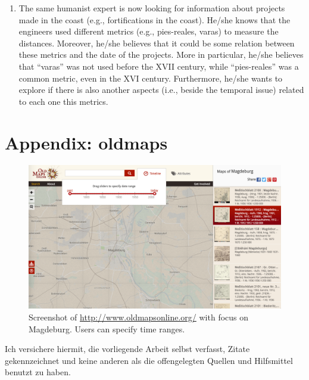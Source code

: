 \documentclass[11pt]{report}
\begin{document}
\begin{enumerate}
	\item The same humanist expert is now looking for information about projects made in the coast (e.g., fortifications in the coast). He/she knows that the engineers used different metrics (e.g., pies-reales, varas) to measure the distances. Moreover, he/she believes that it could be some relation between these metrics and the date of the projects. More in particular, he/she believes that ``varas'' was not used before the XVII century, while ``pies-reales'' was a common metric, even in the XVI century.
Furthermore, he/she wants to explore if there is also another aspects (i.e., beside the temporal issue) related to each one this metrics.
\end{enumerate}

\chapter{Appendix: oldmaps}
\label{app:oldmaps}

\begin{figure}[!ht]
	\centering
	\includegraphics[width=\linewidth]{images/oldmaps}
\caption{Screenshot of \url{http://www.oldmapsonline.org/} with focus on Magdeburg. Users can specify time ranges.}
\label{figure:oldmaps}
\end{figure}


\newpage

Ich versichere hiermit, die vorliegende Arbeit selbst verfasst, Zitate gekennzeichnet und keine anderen als die offengelegten Quellen und Hilfsmittel benutzt zu haben.\\
\end{document}
